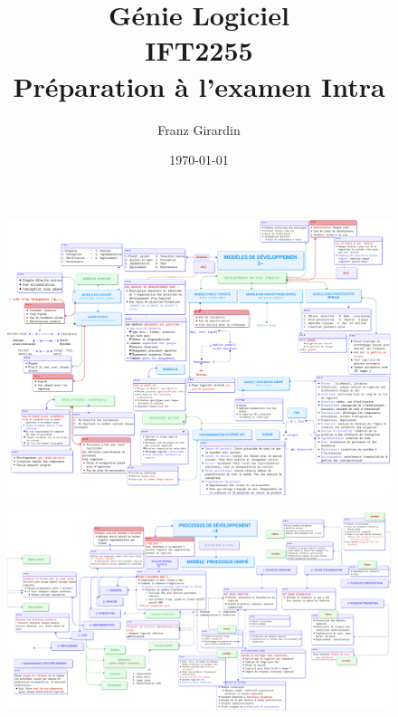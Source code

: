 \documentclass[16pt]{report}
\title{\Huge{Génie Logiciel}\\{IFT2255}\\{\textbf{Préparation à l'examen Intra}}}
\author{\huge{Franz Girardin}}
\date{\today}
\begin{document}
\maketitle
\pagebreak






   




    \begin{figure}
            \includegraphics[height=0.70\textwidth]{IFT2255Chapitre3.png}
    \end{figure}

        \begin{figure}
        \begin{center}
            \includegraphics[width=1.0\textwidth, height=0.7\textwidth]{IFT2255Chapitre4.jpg}
        \end{center}
        \end{figure}
\end{document}

